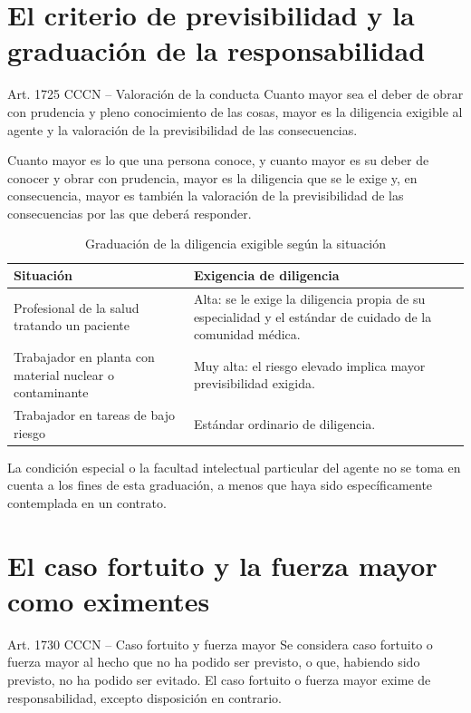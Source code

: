 \documentclass[12pt,oneside]{book}
\begin{document}
\section{El criterio de previsibilidad y la graduación de la responsabilidad}

\begin{definition}{Art. 1725 CCCN -- Valoración de la conducta}
Cuanto mayor sea el deber de obrar con prudencia y pleno conocimiento de las cosas, mayor es la diligencia exigible al agente y la valoración de la previsibilidad de las consecuencias.
\end{definition}

Cuanto mayor es lo que una persona conoce, y cuanto mayor es su deber de conocer y obrar con prudencia, mayor es la diligencia que se le exige y, en consecuencia, mayor es también la valoración de la previsibilidad de las consecuencias por las que deberá responder.

\begin{table}[H]
\centering
\caption{Graduación de la diligencia exigible según la situación}
\begin{tabularx}{\textwidth}{X X}
\toprule
\textbf{Situación} & \textbf{Exigencia de diligencia} \\
\midrule
Profesional de la salud tratando un paciente & Alta: se le exige la diligencia propia de su especialidad y el estándar de cuidado de la comunidad médica. \\
Trabajador en planta con material nuclear o contaminante & Muy alta: el riesgo elevado implica mayor previsibilidad exigida. \\
Trabajador en tareas de bajo riesgo & Estándar ordinario de diligencia. \\
\bottomrule
\end{tabularx}
\end{table}

La condición especial o la facultad intelectual particular del agente no se toma en cuenta a los fines de esta graduación, a menos que haya sido específicamente contemplada en un contrato.

\section{El caso fortuito y la fuerza mayor como eximentes}

\begin{definition}{Art. 1730 CCCN -- Caso fortuito y fuerza mayor}
Se considera caso fortuito o fuerza mayor al hecho que no ha podido ser previsto, o que, habiendo sido previsto, no ha podido ser evitado. El caso fortuito o fuerza mayor exime de responsabilidad, excepto disposición en contrario.
\end{definition}
\end{document}
